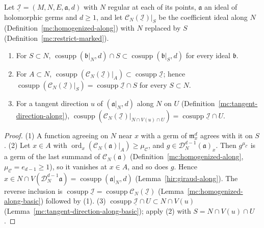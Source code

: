 \begin{lemma}
\label{mc:coefficient-restriction-along}
\leanok
Let \(\underline{\mathcal I}=(M,N,E,\mathfrak a,d)\) with \(N\) regular at each of its points, \(\mathfrak a\) an ideal of holomorphic germs and \(d\ge1\), and let
\(\mathcal C_N(\underline{\mathcal I})|_S\) be the coefficient ideal along \(N\) (Definition~\ref{mc:homogenized-along}) with \(N\) replaced by \(S\)
(Definition~\ref{mc:restrict-marked}).
\begin{enumerate}
\item For \(S\subset N\), \(\operatorname{cosupp}(\mathfrak b|_N,d)\cap S\subset\operatorname{cosupp}(\mathfrak b|_S,d)\) for every ideal \(\mathfrak b\).
\item For \(A\subset N\), \(\operatorname{cosupp}(\mathcal C_N(\underline{\mathcal I})|_A)\subset\operatorname{cosupp}\underline{\mathcal I}\); hence
\(\operatorname{cosupp}(\mathcal C_N(\underline{\mathcal I})|_S)=\operatorname{cosupp}\underline{\mathcal I}\cap S\) for every \(S\subset N\).
\item For a tangent direction \(u\) of \((\mathfrak a|_N,d)\) along \(N\) on \(U\) (Definition~\ref{mc:tangent-direction-along}),
\(\operatorname{cosupp}(\mathcal C_N(\underline{\mathcal I})|_{N\cap V(u)\cap U})=\operatorname{cosupp}\underline{\mathcal I}\cap U\).
\end{enumerate}
\end{lemma}
\begin{proof}
\leanok
(1) A function agreeing on \(N\) near \(x\) with a germ of \(\mathfrak m_x^d\) agrees with it on \(S\). (2) Let \(x\in A\) with
\(\operatorname{ord}_x(\mathcal C_N(\mathfrak a)|_A)\ge\mu_{\mathcal C}\), and \(g\in\mathcal D_N^{d-1}(\mathfrak a)_x\). Then \(g^{\mu_{\mathcal C}}\) is a germ of the last summand of
\(\mathcal C_N(\mathfrak a)\) (Definition~\ref{mc:homogenized-along}, \(\mu_{\mathcal C}=e_{d-1}\ge1\)), so it vanishes at \(x\in A\), and so does \(g\). Hence
\(x\in N\cap V(\mathcal D_N^{d-1}\mathfrak a)=\operatorname{cosupp}(\mathfrak a|_N,d)\) (Lemma~\ref{hir:giraud-along}). The reverse inclusion is
\(\operatorname{cosupp}\underline{\mathcal I}=\operatorname{cosupp}\mathcal C_N(\underline{\mathcal I})\) (Lemma~\ref{mc:homogenized-along-basic}) followed by (1).
(3) \(\operatorname{cosupp}\underline{\mathcal I}\cap U\subset N\cap V(u)\) (Lemma~\ref{mc:tangent-direction-along-basic}); apply (2) with \(S=N\cap V(u)\cap U\).
\end{proof}
